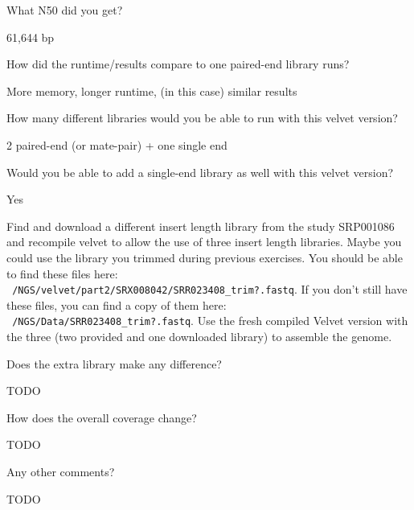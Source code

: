 \begin{questions}
What N50 did you get?
\begin{answer}
61,644 bp
\end{answer}

How did the runtime/results compare to one paired-end library runs?
\begin{answer}
More memory, longer runtime, (in this case) similar results
\end{answer}

How many different libraries would you be able to run with this velvet version?
\begin{answer}
2 paired-end (or mate-pair) + one single end
\end{answer}

Would you be able to add a single-end library as well with this velvet version?
\begin{answer}
Yes
\end{answer}
\end{questions}

\begin{bonus}
Find and download a different insert length library
\footnotemark[1]
from the
study SRP001086 and recompile velvet to allow the use of three insert length
libraries. Maybe you could use the library you trimmed during previous
exercises. You should be able to find these files here:
\texttt{~/NGS/velvet/part2/SRX008042/SRR023408\_trim?.fastq}. If you don't still
have these files, you can find a copy of them here:
\texttt{~/NGS/Data/SRR023408\_trim?.fastq}.
Use the fresh compiled Velvet version with the three (two provided and one
downloaded library) to assemble the genome.
\begin{questions}
Does the extra library make any difference?
\begin{answer}
TODO
\end{answer}

How does the overall coverage change?
\begin{answer}
TODO
\end{answer}

Any other comments?
\begin{answer}
TODO
\end{answer}
\end{questions}
\end{bonus}
